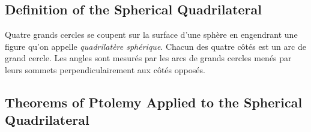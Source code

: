 \documentclass[11pt,a4paper]{article}
\theoremstyle{plain}
\theoremstyle{definition}
\theoremstyle{remark}
\begin{document}
\subsection{Definition of the Spherical Quadrilateral}

\label{sec:def-sph-quad}





Quatre grands cercles se coupent sur la surface d'une sphère en engendrant une figure qu'on appelle \textit{quadrilatère sphérique}. Chacun des quatre côtés est un arc de grand cercle. Les angles sont mesurés par les arcs de grands cercles menés par leurs sommets perpendiculairement aux côtés opposés.





\begin{center}


\end{center}



\subsection{Theorems of Ptolemy Applied to the Spherical Quadrilateral}
\end{document}
